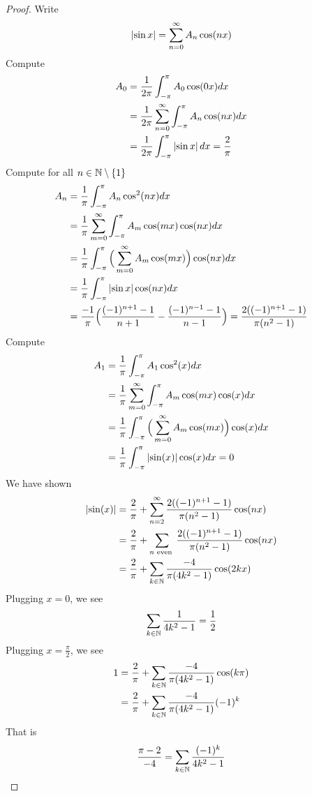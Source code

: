 \documentclass{report}
\begin{document}
\begin{proof}
Write 
\begin{align*}
\left|\sin x\right|= \sum_{n=0}^{\infty}A_n \cos (nx)
\end{align*}
Compute
\begin{align*}
  A_0&=\frac{1}{2\pi }\int_{-\pi }^{\pi } A_0 \cos (0x)dx\\
  &=\frac{1}{2\pi }\sum_{n=0}^{\infty} \int_{-\pi }^{\pi }A_n \cos (nx)dx \\
  &=\frac{1}{2\pi } \int_{-\pi }^{\pi } \left|\sin x\right|dx= \frac{2}{\pi }
\end{align*}
Compute for all $n\in\mathbb{N} \setminus \{ 1 \}$
\begin{align*}
A_n&= \frac{1}{\pi }\int_{-\pi }^{\pi }A_n \cos^2 (nx)dx \\
&=\frac{1}{\pi }\sum_{m=0}^{\infty}\int_{-\pi }^{\pi }A_m \cos (mx)\cos (nx)dx \\
&=\frac{1}{\pi }\int_{-\pi }^{\pi }\Big(\sum_{m=0}^{\infty} A_m \cos (mx)\Big)\cos (nx)dx \\
&=\frac{1}{\pi }\int_{-\pi }^{\pi }\left|\sin x\right|\cos (nx)dx\\
&=\frac{-1}{\pi }\Big(\frac{(-1)^{n+1}-1}{n+1}- \frac{(-1)^{n-1}-1}{n-1} \Big)= \frac{2((-1)^{n+1}-1)}{\pi  (n^2-1)}
\end{align*}
Compute 
\begin{align*}
A_1&= \frac{1}{\pi } \int_{-\pi }^{\pi }A_1\cos ^2(x)dx \\
&=\frac{1}{\pi }\sum_{m=0}^{\infty}\int_{-\pi }^{\pi }A_m \cos (mx)\cos (x)dx \\
&=\frac{1}{\pi }\int_{-\pi }^{\pi }\Big( \sum_{m=0}^{\infty}A_m \cos (mx) \Big) \cos (x)dx \\
&=\frac{1}{\pi }\int_{-\pi }^{\pi } \left|\sin (x)\right|\cos (x)dx =0 
\end{align*}
We have shown 
\begin{align*}
\left|\sin (x)\right|&= \frac{2}{\pi }+ \sum_{n=2}^{\infty} \frac{2((-1)^{n+1}-1)}{\pi  (n^2-1)}\cos (nx) \\
&=\frac{2}{\pi }+ \sum_{n\text{ even }}\frac{2((-1)^{n+1}-1)}{\pi  (n^2-1)}\cos (nx)\\
&=\frac{2}{\pi }+ \sum_{k\in\mathbb{N}} \frac{-4}{\pi  (4k^2-1)}\cos (2kx)
\end{align*}
Plugging $x=0$, we see 
 \begin{align*}
\sum_{k\in\mathbb{N}} \frac{1}{4k^2-1}= \frac{1}{2}
\end{align*}
Plugging $x=\frac{\pi }{2}$, we see 
\begin{align*}
1&= \frac{2}{\pi }+ \sum_{k\in\mathbb{N}} \frac{-4}{\pi  (4k^2-1)}\cos (k\pi ) \\
&= \frac{2}{\pi }+ \sum_{k\in\mathbb{N}} \frac{-4}{\pi  (4k^2-1)}(-1)^k \\
\end{align*}
That is 
\begin{align*}
  \frac{\pi  -2}{-4}= \sum_{k\in\mathbb{N}} \frac{(-1)^k}{4k^2-1}
\end{align*}
\end{proof}
\end{document}
